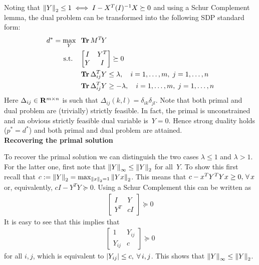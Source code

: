 \documentclass{../../common/projectreport}
\begin{document}
Noting that ${\left\|Y\right\|}_{2}^{}\leq 1 \; \Longleftrightarrow \; I-X^T(I)^{-1}X \succeq 0$ and using a Schur Complement lemma, the dual problem can be transformed into the following SDP standard form:
\begin{align}
\begin{split}
d^* = \max_{Y} \;\; &\operatorname{\mathbf{Tr}} M^T\!Y \\ 
\text{s.t.} \quad &\begin{bmatrix} I & Y^T \\ Y & I \end{bmatrix} \succeq 0 \\
&\operatorname{\mathbf{Tr}} \Delta_{ij}^TY \leq \lambda, \quad i = 1,\dotsc, m, \; j=1,\dotsc,n \\
&\operatorname{\mathbf{Tr}} \Delta_{ij}^TY \geq -\lambda, \quad i = 1,\dotsc, m, \; j=1,\dotsc,n
\end{split}
\label{Algorithms:MainAlgs:IPM:SDPform:DualSDP}
\end{align}
%
Here $\Delta_{ij} \in {\mathbf R}^{m\times n}$ is such that $\Delta_{ij}(k,l) = \delta_{ik}\delta_{jl}$. Note that both primal and dual problem are (trivially) strictly feasible. In fact, the primal is unconstrained and an obvious strictly feasible dual variable is~$Y=0$. Hence strong duality holds ($p^* = d^*$) and both primal and dual problem are attained.\\

\textbf{Recovering the primal solution}

To recover the primal solution we can distinguish the two cases $\lambda \leq 1$ and $\lambda >1$. For the latter one, first note that ${\left\|Y\right\|}_{\infty}^{} \leq {\left\|Y\right\|}_{2}^{}$ for all~$Y$. To show this first recall that $c := {\left\|Y\right\|}_{2}^{} = \max_{{\left\|x\right\|}_{2}^{}=1} {\left\|Yx\right\|}_{2}^{}$. This means that $c - x^TY^TYx \geq0, \,{\forall \,} x$ or, equivalently, $cI-Y^TY \succeq 0$. Using a Schur Complement this can be written as
%
\begin{align*}
\begin{bmatrix} I & Y \\Y^T & cI \end{bmatrix} \succeq 0
\end{align*}
It is easy to see that this implies that  
\begin{align*}
\begin{bmatrix} 1 & Y_{ij} \\Y_{ij} & c \end{bmatrix} \succeq 0
\end{align*}
for all $i,j$, which is equivalent to $|Y_{ij}| \leq c,\; {\forall \,} i,j$. This shows that ${\left\|Y\right\|}_{\infty}^{} \leq {\left\|Y\right\|}_{2}^{}$.
\end{document}

